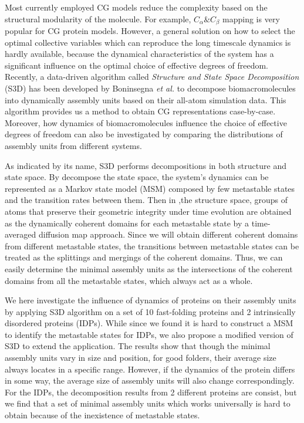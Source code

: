 \documentclass[journal=jacsat,manuscript=article]{achemso}
\begin{document}
Most currently employed CG models reduce the complexity based on the structural modularity of the molecule\cite{CG_model_review}. For example, $C_{\alpha}\&C_{\beta}$ mapping is very popular for CG protein models\cite{structure_based_model,SMOG}. However, a general solution on how to select the optimal collective variables which can reproduce the long timescale dynamics is hardly available, because the dynamical characteristics of the system has a significant influence on the optimal choice of effective degrees of freedom. Recently, a data-driven algorithm called {\it Structure and State Space Decomposition} (S3D) has been developed by Boninsegna {\it et al.} to decompose biomacromolecules into dynamically assembly units based on their all-atom simulation data\cite{Lrenzo_S3D}. This algorithm provides us a method to obtain CG representations case-by-case. Moreover, how dynamics of biomacromolecules influence the choice of effective degrees of freedom can also be investigated by comparing the distributions of assembly units from different systems.

As indicated by its name, S3D performs decompositions in both structure and state space. By decompose the state space, the system's dynamics can be represented as a Markov state model (MSM) composed by few metastable states and the transition rates between them\cite{TICA,TICA_commute_map,TICA_collective_variable,MSM,HMM}. Then in ,the structure space, groups of atoms that preserve their geometric integrity under time evolution are obtained as the dynamically coherent domains for each metastable state by a time-averaged diffusion map approach\cite{diffusion_map_clustering,diffusion_map}. Since we will obtain different coherent domains from different metastable states, the transitions between metastable states can be treated as the splittings and mergings of the coherent domains. Thus, we can easily determine the minimal assembly units as the intersections of the coherent domains from all the metastable states, which always act as a whole\cite{Lrenzo_S3D}.

We here investigate the influence of dynamics of proteins on their assembly units by applying S3D algorithm on a set of 10 fast-folding proteins\cite{DE_Shaw_fast-folding} and 2 intrinsically disordered proteins (IDPs)\cite{ACTR,MYC}. While since we found it is hard to construct a MSM to identify the metastable states for IDPs, we also propose a modified version of S3D to extend the application. The results show that though the minimal assembly units vary in size and position, for good folders, their average size always locates in a specific range. However, if the dynamics of the protein differs in some way, the average size of assembly units will also change correspondingly. For the IDPs, the decomposition results from 2 different proteins are consist, but we find that a set of minimal assembly units which works universally is hard to obtain because of the inexistence of metastable states.
\end{document}
